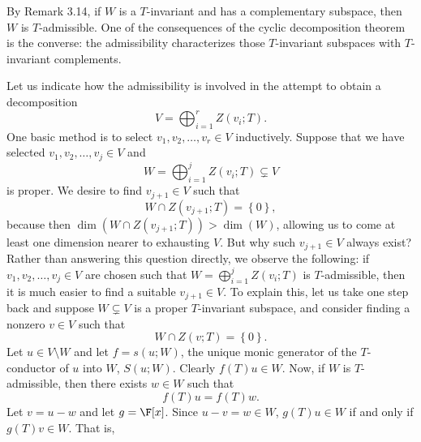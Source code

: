 \documentclass[linearalgebraII]{subfiles}
\begin{document}
    \begin{remark}
        By Remark 3.14, if $W$ is a $T$-invariant and has a complementary subspace, then $W$ is $T$-admissible. One of the consequences of the cyclic decomposition theorem is the converse: the admissibility characterizes those $T$-invariant subspaces with $T$-invariant complements.
    \end{remark}

    \begin{remark}
        Let us indicate how the admissibility is involved in the attempt to obtain a decomposition
        \begin{equation*}
            V = \bigoplus^{r}_{i=1} Z(v_i;T).
        \end{equation*}
        One basic method is to select $v_1, v_2, \ldots, v_r\in V$ inductively. Suppose that we have selected $v_1, v_2, \ldots, v_j\in V$ and
        \begin{equation*}
            W = \bigoplus^{j}_{i=1} Z(v_i;T)\subsetneq V
        \end{equation*}
        is proper. We desire to find $v_{j+1}\in V$ such that
        \begin{equation*}
            W\cap Z(v_{j+1};T) = \left\lbrace 0 \right\rbrace ,
        \end{equation*}
        because then $\dim\left(W\cap Z(v_{j+1};T) \right) > \dim(W)$, allowing us to come at least one dimension nearer to exhausting $V$. But why such $v_{j+1}\in V$ always exist? Rather than answering this question directly, we observe the following: if $v_1, v_2,\ldots, v_j\in V$ are chosen such that $W=\bigoplus^{j}_{i=1} Z(v_i;T)$ is $T$-admissible, then it is much easier to find a suitable $v_{j+1}\in V$. To explain this, let us take one step back and suppose $W\subsetneq V$ is a proper $T$-invariant subspace, and consider finding a nonzero $v\in V$ such that
        \begin{equation*}
            W\cap Z(v;T) = \left\lbrace 0 \right\rbrace .
        \end{equation*}
        Let $u\in V\setminus W$ and let $f=s(u;W)$, the unique monic generator of the $T$-conductor of $u$ into $W$, $S(u;W)$. Clearly $f(T)u\in W$. Now, if $W$ is $T$-admissible, then there exists $w\in W$ such that
        \begin{equation*}
            f(T)u = f(T)w.
        \end{equation*}
        Let $v=u-w$ and let $g=\F[x]$. Since $u-v=w\in W$, $g(T)u\in W$ if and only if $g(T)v\in W$. That is,

\end{remark}
\end{document}
